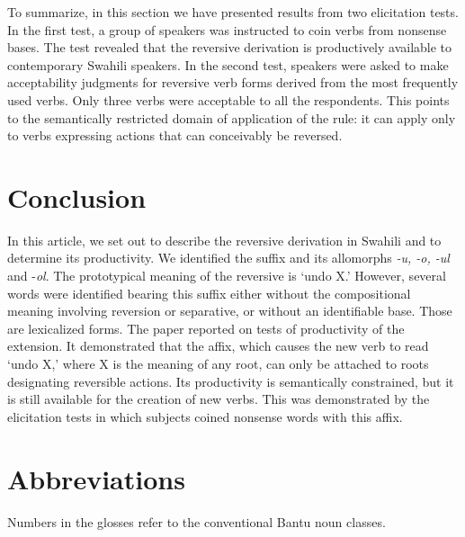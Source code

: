 \documentclass[output=paper]{langsci/langscibook}
\begin{document}
To summarize, in this section we have presented results from two elicitation tests. In the first test, a group of speakers was instructed to coin verbs from nonsense bases. The test revealed that the reversive derivation is productively available to contemporary Swahili speakers. In the second test, speakers were asked to make acceptability judgments for reversive verb forms derived from the most frequently used verbs. Only three verbs were acceptable to all the respondents. This points to the semantically restricted domain of application of the rule: it can apply only to verbs expressing actions that can conceivably be reversed.

\section{Conclusion}\label{sec:ngonyaningowa:6}

In this article, we set out to describe the reversive derivation in Swahili and to determine its productivity. We identified the suffix and its allomorphs \textit{{}-u, -o, -ul} and  {}-\textit{ol}. The prototypical meaning of the reversive is ‘undo X.’ However, several words were identified bearing this suffix either without the compositional meaning involving reversion or separative, or without an identifiable base. Those are lexicalized forms. The paper reported on tests of productivity of the extension. It demonstrated that the affix, which causes the new verb to read ‘undo X,’ where X is the meaning of any root, can only be attached to roots designating reversible actions. Its productivity is semantically constrained, but it is still available for the creation of new verbs. This was demonstrated by the elicitation tests in which subjects coined nonsense words with this affix. 

\section*{Abbreviations} 

Numbers in the glosses refer to the conventional Bantu noun classes.\\
\end{document}
